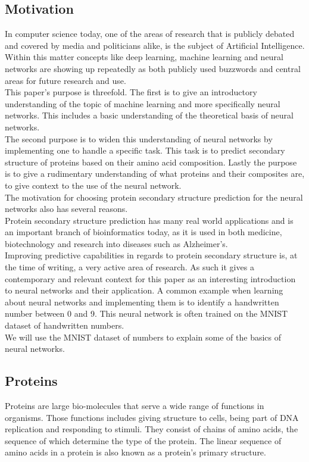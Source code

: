 \subsection{Motivation}
In computer science today, one of the areas of research that is publicly debated and covered by media and politicians alike, is the subject of Artificial Intelligence. Within this matter concepts like deep learning, machine learning and neural networks are showing up repeatedly as both publicly used buzzwords and central areas for future research and use.\\
This paper's purpose is threefold. The first is to give an introductory understanding of the topic of machine learning and more specifically neural networks. This includes a basic understanding of the theoretical basis of neural networks. \\
The second purpose is to widen this understanding of neural networks by implementing one to handle a specific task. This task is to predict secondary structure of proteins based on their amino acid composition. Lastly the purpose is to give a rudimentary understanding of what proteins and their composites are, to give context to the use of the neural network.\\
The motivation for choosing protein secondary structure prediction for the neural networks also has several reasons. \\
Protein secondary structure prediction has many real world applications and is an important branch of bioinformatics today, as it is used in both medicine, biotechnology and research into diseases such as Alzheimer's. \citep[p. 113]{BrandenCarl1991Itps}\\
Improving predictive capabilities in regards to protein secondary structure is, at the time of writing, a very active area of research. As such it gives a contemporary and relevant context for this paper as an interesting introduction to neural networks and their application.   
A common example when learning about neural networks and implementing them is to identify a handwritten number between 0 and 9. This neural network is often trained on the MNIST dataset of handwritten numbers. \\
We will use the MNIST dataset of numbers to explain some of the basics of neural networks. 


\subsection{Proteins}
Proteins are large bio-molecules that serve a wide range of functions in organisms. Those functions includes giving structure to cells, being part of DNA replication and responding to stimuli. They consist of chains of amino acids, the sequence of which determine the type of the protein. The linear sequence of amino acids in a protein is also known as a protein's primary structure. \cite{BrandenCarl1991Itps}

